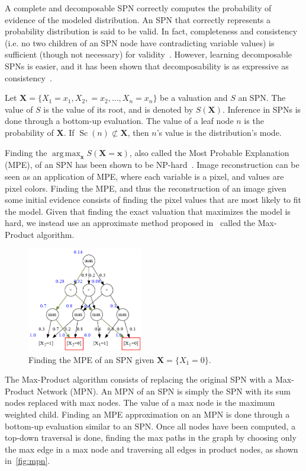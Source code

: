 \documentclass{article}
\DeclareMathOperator*{\argmax}{arg\,max}
\DeclareMathOperator*{\Sc}{\text{Sc}}
\begin{document}
A complete and decomposable SPN correctly computes the probability of evidence of the modeled
distribution. An SPN that correctly represents a probability distribution is said to be valid. In
fact, completeness and consistency (i.e. no two children of an SPN node have contradicting variable
values) is sufficient (though not necessary) for validity~\cite{poon11}. However, learning
decomposable SPNs is easier, and it has been shown that decomposability is as expressive as
consistency~\cite{peharz15}.

Let $\mathbf{X}=\{X_1=x_1,X_2,=x_2,\ldots,X_n=x_n\}$ be a valuation and $S$ an SPN. The value of
$S$ is the value of its root, and is denoted by $S(\mathbf{X})$. Inference in SPNs is done through
a bottom-up evaluation. The value of a leaf node $n$ is the probability of $\mathbf{X}$. If
$\Sc(n)\not\subset\mathbf{X}$, then $n$'s value is the distribution's mode.

Finding the $\argmax_{\mathbf{x}} S(\mathbf{X}=\mathbf{x})$, also called the Most Probable
Explanation (MPE), of an SPN has been shown to be NP-hard~\cite{peharz15,mei18,conaty17}. Image
reconstruction can be seen as an application of MPE, where each variable is a pixel, and values are
pixel colors. Finding the MPE, and thus the reconstruction of an image given some initial evidence
consists of finding the pixel values that are most likely to fit the model. Given that finding the
exact valuation that maximizes the model is hard, we instead use an approximate method proposed
in~\cite{poon11} called the Max-Product algorithm.

\begin{figure}[t]
  \centering\centerline{\includegraphics[width=0.45\textwidth]{imgs/sample_mpn_prob.png}}
  \caption{Finding the MPE of an SPN given $\mathbf{X}=\{X_1=0\}$.\label{fig:mpn}}
\end{figure}

The Max-Product algorithm consists of replacing the original SPN with a Max-Product Network (MPN).
An MPN of an SPN is simply the SPN with its sum nodes replaced with max nodes. The value of a max
node is the maximum weighted child. Finding an MPE approximation on an MPN is done through a
bottom-up evaluation similar to an SPN. Once all nodes have been computed, a top-down traversal is
done, finding the max paths in the graph by choosing only the max edge in a max node and traversing
all edges in product nodes, as shown in~\autoref{fig:mpn}.
\end{document}
